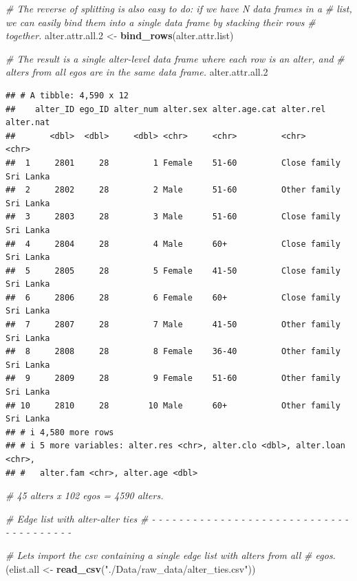 \documentclass[
]{book}
\newenvironment{Shaded}{\begin{snugshade}}{\end{snugshade}}
\newcommand{\CommentTok}[1]{\textcolor[rgb]{0.56,0.35,0.01}{\textit{#1}}}
\newcommand{\FloatTok}[1]{\textcolor[rgb]{0.00,0.00,0.81}{#1}}
\newcommand{\FunctionTok}[1]{\textcolor[rgb]{0.13,0.29,0.53}{\textbf{#1}}}
\newcommand{\NormalTok}[1]{#1}
\newcommand{\OtherTok}[1]{\textcolor[rgb]{0.56,0.35,0.01}{#1}}
\newcommand{\StringTok}[1]{\textcolor[rgb]{0.31,0.60,0.02}{#1}}
\begin{document}
\begin{Shaded}
\begin{Highlighting}[]
\CommentTok{\# The reverse of splitting is also easy to do: if we have N data frames in a}
\CommentTok{\# list, we can easily bind them into a single data frame by stacking their rows}
\CommentTok{\# together.}
\NormalTok{alter.attr.all}\FloatTok{.2} \OtherTok{\textless{}{-}} \FunctionTok{bind\_rows}\NormalTok{(alter.attr.list)}

\CommentTok{\# The result is a single alter{-}level data frame where each row is an alter, and}
\CommentTok{\# alters from all egos are in the same data frame.}
\NormalTok{alter.attr.all}\FloatTok{.2}
\end{Highlighting}
\end{Shaded}

\begin{verbatim}
## # A tibble: 4,590 x 12
##    alter_ID ego_ID alter_num alter.sex alter.age.cat alter.rel    alter.nat
##       <dbl>  <dbl>     <dbl> <chr>     <chr>         <chr>        <chr>    
##  1     2801     28         1 Female    51-60         Close family Sri Lanka
##  2     2802     28         2 Male      51-60         Other family Sri Lanka
##  3     2803     28         3 Male      51-60         Close family Sri Lanka
##  4     2804     28         4 Male      60+           Close family Sri Lanka
##  5     2805     28         5 Female    41-50         Close family Sri Lanka
##  6     2806     28         6 Female    60+           Close family Sri Lanka
##  7     2807     28         7 Male      41-50         Other family Sri Lanka
##  8     2808     28         8 Female    36-40         Other family Sri Lanka
##  9     2809     28         9 Female    51-60         Other family Sri Lanka
## 10     2810     28        10 Male      60+           Other family Sri Lanka
## # i 4,580 more rows
## # i 5 more variables: alter.res <chr>, alter.clo <dbl>, alter.loan <chr>,
## #   alter.fam <chr>, alter.age <dbl>
\end{verbatim}

\begin{Shaded}
\begin{Highlighting}[]
\CommentTok{\# 45 alters x 102 egos = 4590 alters.}

\CommentTok{\# Edge list with alter{-}alter ties}
\CommentTok{\# {-} {-} {-} {-} {-} {-} {-} {-} {-} {-} {-} {-} {-} {-} {-} {-} {-} {-} {-} {-} {-} {-} {-} {-} {-} {-} {-} {-} {-} {-} {-} {-} {-} {-} {-} {-} {-} {-} {-} }

\CommentTok{\# Let\textquotesingle{}s import the csv containing a single edge list with alters from all}
\CommentTok{\# egos.}
\NormalTok{(elist.all }\OtherTok{\textless{}{-}} \FunctionTok{read\_csv}\NormalTok{(}\StringTok{"./Data/raw\_data/alter\_ties.csv"}\NormalTok{))}
\end{Highlighting}
\end{Shaded}
\end{document}
